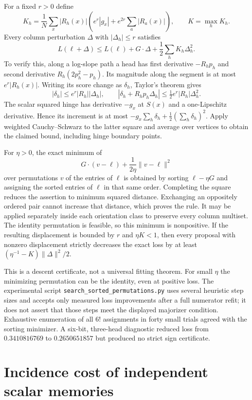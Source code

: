 \documentclass[11pt]{article}
\begin{document}
For a fixed $r>0$ define
\[
 K_h=\frac1N\sum_x |R_h(x)|\left(e^r|g_x|
                  +e^{2r}\sum_a|R_a(x)|\right),\qquad K=\max_h K_h.
\]
Every column perturbation $\Delta$ with $|\Delta_h|\le r$ satisfies
\[
 L(\ell+\Delta)\le L(\ell)+G\cdot\Delta
                         +\frac12\sum_hK_h\Delta_h^2.
\]
To verify this, along a log-slope path a head has first derivative
$-R_hp_h$ and second derivative $R_h(2p_h^2-p_h)$.
Its magnitude along the segment is at most $e^r|R_h(x)|$.
Writing its score change as $\delta_h$, Taylor's theorem gives
\[
 |\delta_h|\le e^r|R_h||\Delta_h|,\qquad
 |\delta_h+R_hp_h\Delta_h|\le\tfrac12e^r|R_h|\Delta_h^2.
\]
The scalar squared hinge has derivative $-g_x$ at $S(x)$ and a
one-Lipschitz derivative. Hence its increment is at most
$-g_x\sum_h\delta_h+\frac12(\sum_h\delta_h)^2$.
Apply weighted Cauchy--Schwarz to the latter square and average over
vertices to obtain the claimed bound, including hinge boundary points.

For $\eta>0$, the exact minimum of
\[
 G\cdot(v-\ell)+\frac1{2\eta}\|v-\ell\|^2
\]
over permutations $v$ of the entries of $\ell$ is obtained by sorting
$\ell-\eta G$ and assigning the sorted entries of $\ell$ in that
same order. Completing the square reduces the assertion to minimum
squared distance. Exchanging an oppositely ordered pair cannot increase
that distance, which proves the rule. It may be applied separately
inside each orientation class to preserve every column multiset.
The identity permutation is feasible, so this minimum is nonpositive.
If the resulting displacement is bounded by $r$ and $\eta K<1$,
then every proposal with nonzero displacement strictly decreases the exact loss by
at least $(\eta^{-1}-K)\|\Delta\|^2/2$.

This is a descent certificate, not a universal fitting theorem. For
small $\eta$ the minimizing permutation can be the identity, even at
positive loss. The experimental script
\texttt{search\_sorted\_permutations.py} uses several heuristic step
sizes and accepts only measured loss improvements after a full
numerator refit; it does not assert that those steps meet the displayed
majorizer condition. Exhaustive enumeration of all $6!$ assignments
in forty small trials agreed with the sorting minimizer. A six-bit,
three-head diagnostic reduced loss from $0.3410816769$ to
$0.2650651857$ but produced no strict sign certificate.


\section{Incidence cost of independent scalar memories}
\end{document}
